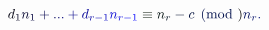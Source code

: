 \documentclass[12pt]{article}
\begin{document}
\makeatletter
\renewcommand*{\@textcolor}[3]{%
  \protect\leavevmode
  \begingroup
    \color#1{#2}#3%
  \endgroup
}
\makeatother
\begin{displaymath}
\mathcolor[RGB]{0,0,15}{d} _ { \mathcolor[RGB]{0,0,30}{1} } \mathcolor[RGB]{0,0,45}{n} _ { \mathcolor[RGB]{0,0,60}{1} } \mathcolor[RGB]{0,0,75}{+} \mathcolor[RGB]{0,0,90}{.} \mathcolor[RGB]{0,0,105}{.} \mathcolor[RGB]{0,0,120}{.} \mathcolor[RGB]{0,0,135}{+} \mathcolor[RGB]{0,0,150}{d} _ { \mathcolor[RGB]{0,0,165}{r} \mathcolor[RGB]{0,0,180}{-} \mathcolor[RGB]{0,0,195}{1} } \mathcolor[RGB]{0,0,210}{n} _ { \mathcolor[RGB]{0,0,225}{r} \mathcolor[RGB]{0,0,240}{-} \mathcolor[RGB]{0,0,255}{1} } \mathcolor[RGB]{0,15,0}{\equiv} \mathcolor[RGB]{0,15,15}{n} _ { \mathcolor[RGB]{0,15,30}{r} } \mathcolor[RGB]{0,15,45}{-} \mathcolor[RGB]{0,15,60}{c} \mathcolor[RGB]{0,15,75}{\pmod} { \mathcolor[RGB]{0,15,90}{n} _ { \mathcolor[RGB]{0,15,105}{r} } } \mathcolor[RGB]{0,15,120}{.}
\end{displaymath}
\end{document}
